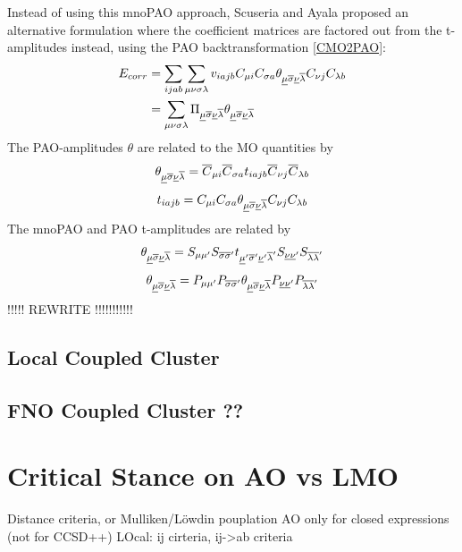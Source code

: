 \noindent Instead of using this mnoPAO approach, Scuseria and Ayala proposed an alternative formulation where the coefficient matrices are factored out from the t-amplitudes instead, using the PAO backtransformation \ref{CMO2PAO}:
\begin{equation}
\begin{split}
E_{corr} &= \sum_{ijab} \sum_{\mu\nu\sigma\lambda} v_{iajb} C_{\mu i} C_{\sigma  a} \theta_{\underline{\mu}\overline{\sigma}\underline{\nu}\overline{\lambda}} C_{\nu j} C_{\lambda b} \\
&= \sum_{\mu\nu\sigma\lambda} \Pi_{\underline{\mu}\overline{\sigma}\underline{\nu}\overline{\lambda}} \theta_{\underline{\mu}\overline{\sigma}\underline{\nu}\overline{\lambda}}
\end{split} 
\end{equation}
\noindent The PAO-amplitudes $\theta$ are related to the MO quantities by
\begin{equation}
\theta_{\underline{\mu}\overline{\sigma}\underline{\nu}\overline{\lambda}} = \overline{C}_{\mu i} \overline{C}_{\sigma a} t_{iajb} \overline{C}_{\nu j} \overline{C}_{\lambda b}
\end{equation}
\begin{equation}
t_{iajb} = C_{\mu i} C_{\sigma a} \theta_{\underline{\mu}\overline{\sigma}\underline{\nu}\overline{\lambda}} C_{\nu j} C_{\lambda b}
\end{equation}
\noindent The mnoPAO and PAO t-amplitudes are related by
\begin{equation}
\theta_{\underline{\mu}\overline{\sigma}\underline{\nu}\overline{\lambda}} = S_{\mu\mu'} S_{\overline{\sigma}\overline{\sigma}'} t_{\underline{\mu}'\overline{\sigma}'\underline{\nu}'\overline{\lambda}'} S_{\underline{\nu}\underline{\nu}'} S_{\overline{\lambda}\overline{\lambda}'}  
\end{equation}
\begin{equation}
\theta_{\underline{\mu}\overline{\sigma}\underline{\nu}\overline{\lambda}} = P_{\mu\mu'} P_{\overline{\sigma}\overline{\sigma}'} \theta_{\underline{\mu}\overline{\sigma}\underline{\nu}\overline{\lambda}} P_{\underline{\nu}\underline{\nu}'} P_{\overline{\lambda}\overline{\lambda}'} 
\end{equation}
!!!!! REWRITE !!!!!!!!!!!

\subsection{Local Coupled Cluster}

\subsection{FNO Coupled Cluster ??}

\section{Critical Stance on AO vs LMO} 

Distance criteria, or Mulliken/Löwdin pouplation
AO only for closed expressions (not for CCSD++) 
LOcal: ij cirteria, ij->ab criteria %




